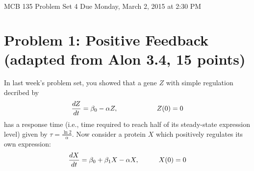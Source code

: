 \documentclass{article}
\begin{document}
\large

MCB 135 Problem Set 4 \hfill Due Monday, March 2, 2015 at 2:30 PM

\section*{Problem 1: Positive Feedback (adapted from Alon 3.4, 15 points)}

In last week's problem set, you showed that a gene $Z$ with simple regulation decribed by
\begin{eqnarray*}
\frac{dZ}{dt} = \beta_0 - \alpha Z, \hspace{2 cm} Z(0)=0
\end{eqnarray*}
has a response time (i.e., time required to reach half of its steady-state expression level) given by $\tau=\frac{\ln 2}{\alpha}$. Now consider a protein $X$ which positively regulates its own expression:
\[ \frac{dX}{dt} = \beta_0 + \beta_1 X  - \alpha X, \hspace{1 cm} X(0)=0\]
\end{document}
